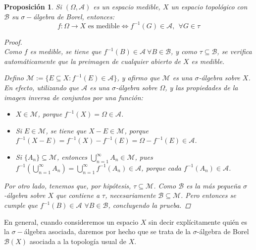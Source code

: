 \documentclass[11pt, a4paper]{article}
\theoremstyle{theorem-style}
\newtheorem{nprop}{Proposición}[section]
\theoremstyle{definition-style}
\theoremstyle{remark-style}
\theoremstyle{example-style}
\begin{document}
\begin{nprop}Si $(\Omega,\mathcal{A})$ es un espacio medible, $X$ un espacio topológico con $\mathcal B$ su $\sigma-$álgebra de Borel, entonces:
  \[
    f: \Omega \to X \text{ es medible} \iff f^{-1}(G) \in \mathcal{A}, \ \ \forall G \in \tau
  \]
  
  \begin{proof} \hfill \\
	\boxed{\Rightarrow} Como $f$ es medible, se tiene que $f^{-1}(B) \in \mathcal A \ \forall B \in \mathcal B$, y como $\tau \subseteq \mathcal B$, se verifica automáticamente que la preimagen de cualquier abierto de $X$ es medible.

\boxed{\Leftarrow} Defino $\mathcal M := \{ E \subseteq X: f^{-1}(E) \in \mathcal A\}$, y afirmo que $\mathcal M$ es una $\sigma$-álgebra sobre $X$. En efecto, utilizando que $\mathcal A$ es una $\sigma$-álgebra sobre $\Omega$, y las propiedades de la imagen inversa de conjuntos por una función:

\begin{itemize}
	\item $X \in \mathcal M$, porque $f^{-1}(X) = \Omega \in \mathcal A$.

    \item Si $E \in \mathcal M$, se tiene que $X - E \in \mathcal M$, porque $f^{-1}(X-E) = f^{-1}(X) - f^{-1}(E) = \Omega - f^{-1}(E) \in \mathcal A$.

    \item Si $\{A_n\} \subseteq \mathcal M$, entonces $\bigcup_{n=1}^\infty A_n \in \mathcal M$, pues $f^{-1}\left( \bigcup_{n=1}^\infty A_n \right) = \bigcup_{n=1}^\infty f^{-1}(A_n) \in \mathcal A$, porque cada $f^{-1}(A_n) \in \mathcal A$.
\end{itemize}

Por otro lado, tenemos que, por hipótesis, $\tau \subseteq \mathcal M$. Como $\mathcal B$ es la más pequeña $\sigma$-álgebra sobre $X$ que contiene a $\tau$, necesariamente $\mathcal B \subseteq \mathcal M$. Pero entonces se cumple que \mbox{$f^{-1}(B) \in \mathcal A$} $\forall B \in \mathcal B$, concluyendo la prueba.
\end{proof}
\end{nprop}

En general, cuando consideremos un espacio $X$ sin decir explícitamente quién es la $\sigma-$álgebra asociada, daremos por hecho que se trata de la $\sigma$-álgebra de Borel $\mathcal B(X)$ asociada a la topología usual de $X$.
\end{document}
